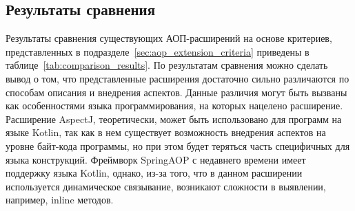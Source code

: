 \subsection{Результаты сравнения}
\label{sub:comparison_results}
Результаты сравнения существующих АОП-расширений на основе критериев,
представленных в подразделе~\ref{sec:aop_extension_criteria} приведены в
таблице~\ref{tab:comparison_results}.
По результатам сравнения можно сделать вывод о том, что представленные расширения достаточно сильно различаются по способам описания и внедрения аспектов.
Данные различия могут быть вызваны как особенностями языка программирования, на которых нацелено расширение.
Расширение AspectJ, теоретически, может быть использовано для программ на языке Kotlin, так как в нем существует возможность внедрения аспектов на уровне байт-кода программы, но при этом будет теряться часть специфичных для языка конструкций.
Фреймворк SpringAOP с недавнего времени имеет поддержку языка Kotlin, 
однако, из-за того, что в данном расширении используется динамическое связывание, возникают сложности в выявлении, например, inline методов.

